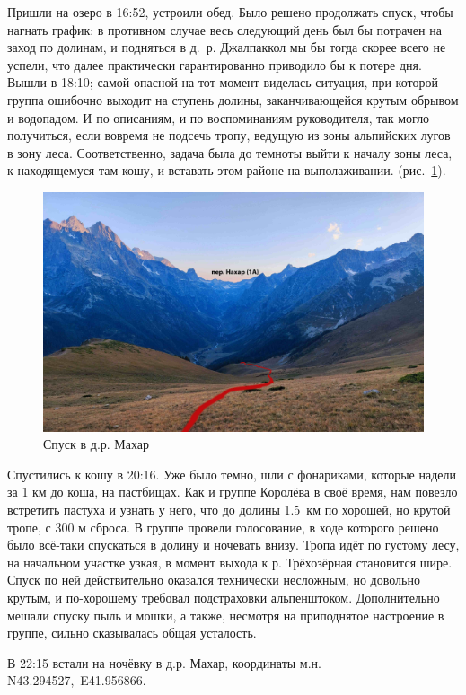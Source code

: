 Пришли на озеро в 16:52, устроили обед. Было решено продолжать спуск, чтобы нагнать график: в противном случае весь следующий день был бы потрачен на заход по долинам, и подняться в д.~р. Джалпаккол мы бы тогда скорее всего не успели, что далее практически гарантированно приводило бы к потере дня. Вышли в 18:10; самой опасной на тот момент виделась ситуация, при которой группа ошибочно выходит на ступень долины, заканчивающейся крутым обрывом и водопадом. И по описаниям, и по воспоминаниям руководителя, так могло получиться, если вовремя не подсечь тропу, ведущую из зоны альпийских лугов в зону леса. Соответственно, задача была до темноты выйти к началу зоны леса, к находящемуся там кошу, и вставать этом районе на выполаживании.  (рис.~\ref{fig:IMG_20240820_184645.jpg}).
\begin{figure}[h!]
	\centering
	\includegraphics[width=0.7\linewidth]{../pics/IMG_20240820_184645.jpg}
	\caption{Спуск в д.р. Махар}
	\label{fig:IMG_20240820_184645.jpg}
\end{figure}

Спустились к кошу в 20:16. Уже было темно, шли с фонариками, которые надели за 1 км до коша, на пастбищах. Как и группе Королёва в своё время, нам повезло встретить пастуха и узнать у него, что до долины 1.5~км по хорошей, но крутой тропе, с 300 м сброса. В группе провели голосование, в ходе которого решено было всё-таки спускаться в долину и ночевать внизу. Тропа идёт по густому лесу, на начальном участке узкая, в момент выхода к р. Трёхозёрная становится шире. Спуск по ней действительно оказался технически несложным, но довольно крутым, и по-хорошему требовал подстраховки альпенштоком. Дополнительно мешали спуску пыль и мошки, а также, несмотря на приподнятое настроение в группе, сильно сказывалась общая усталость.

В 22:15 встали на ночёвку в д.р. Махар, координаты м.н. N43.294527\degree,~E41.956866\degree.

\clearpage 

